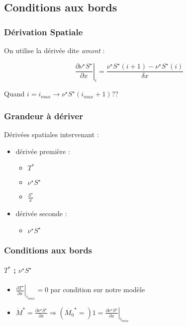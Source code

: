 \subsection{Conditions aux bords}


\begin{frame}
\frametitle{Dérivation Spatiale}

On utilise la dérivée dite \textit{amont} : 

\begin{equation*}
\left. \frac{\partial \nu^{\star} S^{\star}}{\partial x} \right|_i = \frac{\nu^{\star}S^{\star}(i+1)-\nu^{\star}S^{\star}(i)}{\delta x} 
\end{equation*}


Quand $i=i_{max} \rightarrow \nu^{\star}S^{\star}(i_{max}+1) $??

\end{frame}


\begin{frame}
\frametitle{Grandeur à dériver}
Dérivées spatiales intervenant :

\begin{itemize}
    \item dérivée première :
    \begin{itemize}
        \item $T^*$
        \item $ \nu^{\star}S^{\star}$
        \item $\frac{S^{\star}}{x}$
    \end{itemize}
    \item dérivée seconde :
    \begin{itemize}
        \item $ \nu^{\star}S^{\star}$
    \end{itemize}
\end{itemize}

\end{frame}


\begin{frame}
\frametitle{Conditions aux bords}
\framesubtitle{$T^*$ ; $\nu^{\star} S^{\star}$}

\begin{itemize}

\item $\left.\frac{\partial T^{\star}}{\partial x}\right|_{i_{max}} =0$ par condition sur notre modèle

\item $\dot{M}^{\star} = \frac{\partial \nu^{\star} S^{\star}}{\partial x} \Rightarrow (\dot{M_0}^{\star} =)1= \left. \frac{\partial \nu^{\star} S^{\star}}{\partial x} \right|_{i_{max}} $

\end{itemize}

\end{frame}

